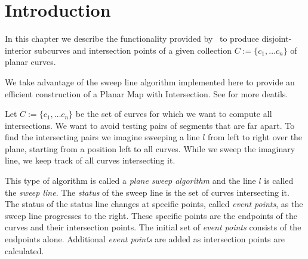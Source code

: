 \section{Introduction}


In this chapter we describe the functionality provided by
\cgal\ to produce disjoint-interior subcurves and intersection points 
of a given collection 
$C:=\{c_1, \ldots c_n\}$ of planar curves.

We take advantage of the sweep line algorithm implemented here to provide
an efficient construction of a Planar Map with Intersection. See 
 for more deatils.

Let $C:=\{c_1, \ldots c_n\}$ be the set of curves for which we want 
to compute all intersections. We want to avoid testing pairs of segments 
that are far apart. To find the intersecting pairs we imagine sweeping  
a line $l$ from left to right over the plane, starting from a position 
left to all curves. While we sweep the imaginary line, we keep track of all 
curves intersecting it.

This type of algorithm is called a {\em plane sweep algorithm} and the line 
$l$ is called the {\em sweep line}. The {\em status} of the sweep line is 
the set of curves intersecting it. The status of the status line changes at 
specific points, called {\em event points},  
as the sweep line progresses to the right. These specific points are
the endpoints of the curves and their intersection points. The initial set of 
{\em event points} consists of the endpoints alone. Additional 
{\em event points} are added as intersection points are calculated.
